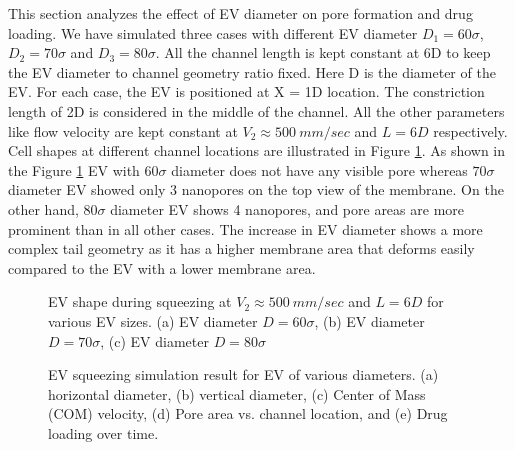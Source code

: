This section analyzes the effect of EV diameter on pore formation and drug loading. We have simulated three cases with different EV diameter $D_1=60\sigma$,\ $D_2=70\sigma$ and $D_3=80\sigma$. All the channel length is kept constant at 6D to keep the EV diameter to channel geometry ratio fixed. Here D is the diameter of the EV. For each case, the EV is positioned at X = 1D location. The constriction length of 2D is considered in the middle of the channel. All the other parameters like flow velocity are kept constant at $V_2\approx500\ mm/sec$ and $L=6D$ respectively. Cell shapes at different channel locations are illustrated in Figure \ref{fig:9}. As shown in the Figure \ref{fig:9} EV with $60\sigma$ diameter does not have any visible pore whereas $70\sigma$ diameter EV showed only 3 nanopores on the top view of the membrane. On the other hand, $80\sigma$ diameter EV shows 4 nanopores, and pore areas are more prominent than in all other cases. The increase in EV diameter shows a more complex tail geometry as it has a higher membrane area that deforms easily compared to the EV with a lower membrane area.

\begin{figure}[htbp]
  \centering
  
  \vspace{0.5cm}
  \caption{EV shape during squeezing at ${V_2}\approx 500\ mm/sec$ and $L=6D$ for various EV sizes.
  (a) EV diameter $D=60\sigma$, (b) EV diameter $D=70\sigma$, (c) EV diameter $D=80\sigma$}
  \label{fig:9}
\end{figure}

\begin{figure}[htbp]
  \centering
  
  \vspace{0.5cm}
  \caption{EV squeezing simulation result for EV of various diameters. (a)  horizontal diameter, (b) vertical diameter, (c) Center of Mass (COM) velocity, (d) Pore area vs. channel location, and (e) Drug loading over time.}
  \label{fig:10}
\end{figure}

